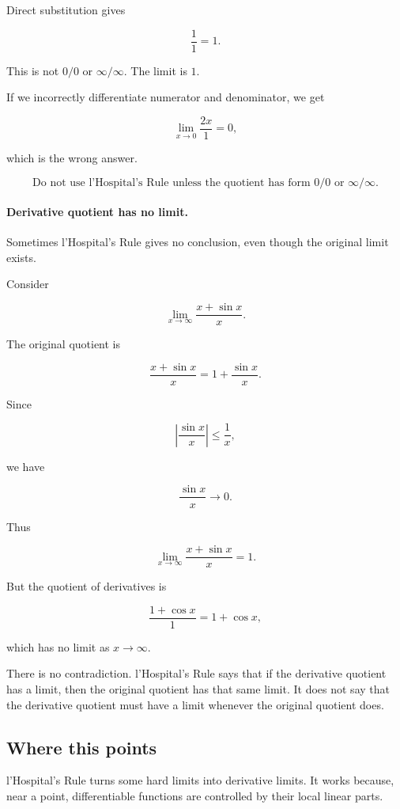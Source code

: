 Direct substitution gives

\[
\frac{1}{1}=1.
\]

This is not \(0/0\) or \(\infty/\infty\).  The limit is \(1\).

If we incorrectly differentiate numerator and denominator, we get

\[
\lim_{x\to0}\frac{2x}{1}=0,
\]

which is the wrong answer.

\[
\boxed{
\text{Do not use l'Hospital's Rule unless the quotient has form }0/0
\text{ or }\infty/\infty.
}
\]

\paragraph{Derivative quotient has no limit.}
Sometimes l'Hospital's Rule gives no conclusion, even though the original limit exists.

Consider

\[
\lim_{x\to\infty}\frac{x+\sin x}{x}.
\]

The original quotient is

\[
\frac{x+\sin x}{x}
=
1+\frac{\sin x}{x}.
\]

Since

\[
\left|\frac{\sin x}{x}\right|\le \frac1x,
\]

we have

\[
\frac{\sin x}{x}\to0.
\]

Thus

\[
\lim_{x\to\infty}\frac{x+\sin x}{x}=1.
\]

But the quotient of derivatives is

\[
\frac{1+\cos x}{1}=1+\cos x,
\]

which has no limit as \(x\to\infty\).

There is no contradiction.  l'Hospital's Rule says that if the derivative quotient has a
limit, then the original quotient has that same limit.  It does not say that the derivative
quotient must have a limit whenever the original quotient does.

\subsection{Where this points}
\label{subsec:lhospital-hook-warning-review}

l'Hospital's Rule turns some hard limits into derivative limits.  It works because, near
a point, differentiable functions are controlled by their local linear parts.

